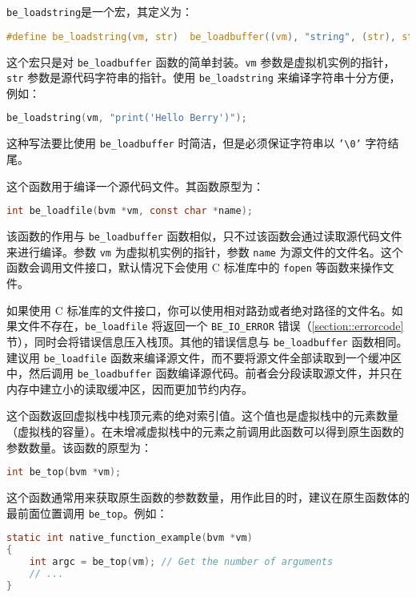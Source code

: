 
\texttt{be\_loadstring}是一个宏，其定义为：
\begin{lstlisting}[language=c, style=berry, numbers=none]
#define be_loadstring(vm, str)  be_loadbuffer((vm), "string", (str), strlen(str))
\end{lstlisting}
这个宏只是对 \texttt{be\_loadbuffer} 函数的简单封装。\texttt{vm} 参数是虚拟机实例的指针，\texttt{str} 参数是源代码字符串的指针。使用 \texttt{be\_loadstring} 来编译字符串十分方便，例如：
\begin{lstlisting}[language=c, style=berry, numbers=none]
be_loadstring(vm, "print('Hello Berry')");
\end{lstlisting}
这种写法要比使用 \texttt{be\_loadbuffer} 时简洁，但是必须保证字符串以 \texttt{'\textbackslash 0'} 字符结尾。


这个函数用于编译一个源代码文件。其函数原型为：
\begin{lstlisting}[language=c, style=berry, numbers=none]
int be_loadfile(bvm *vm, const char *name);
\end{lstlisting}
该函数的作用与 \texttt{be\_loadbuffer} 函数相似，只不过该函数会通过读取源代码文件来进行编译。参数 \texttt{vm} 为虚拟机实例的指针，参数 \texttt{name} 为源文件的文件名。这个函数会调用文件接口，默认情况下会使用 C 标准库中的 \texttt{fopen} 等函数来操作文件。

如果使用 C 标准库的文件接口，你可以使用相对路劲或者绝对路径的文件名。如果文件不存在，\texttt{be\_loadfile} 将返回一个 \texttt{BE\_IO\_ERROR} 错误（\ref{section::errorcode}节），同时会将错误信息压入栈顶。其他的错误信息与 \texttt{be\_loadbuffer} 函数相同。建议用 \texttt{be\_loadfile} 函数来编译源文件，而不要将源文件全部读取到一个缓冲区中，然后调用 \texttt{be\_loadbuffer} 函数编译源代码。前者会分段读取源文件，并只在内存中建立小的读取缓冲区，因而更加节约内存。


这个函数返回虚拟栈中栈顶元素的绝对索引值。这个值也是虚拟栈中的元素数量（虚拟栈的容量）。在未增减虚拟栈中的元素之前调用此函数可以得到原生函数的参数数量。该函数的原型为：
\begin{lstlisting}[language=c, style=berry, numbers=none]
int be_top(bvm *vm);
\end{lstlisting}

这个函数通常用来获取原生函数的参数数量，用作此目的时，建议在原生函数体的最前面位置调用 \texttt{be\_top}。例如：
\begin{lstlisting}[language=c, style=berry, numbers=none]
static int native_function_example(bvm *vm)
{
    int argc = be_top(vm); // Get the number of arguments
    // ...
}
\end{lstlisting}

